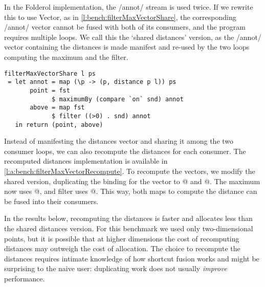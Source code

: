 In the Folderol implementation, the \Hs/annot/ stream is used twice.
If we rewrite this to use Vector, as in \cref{l:bench:filterMaxVectorShare}, the corresponding \Hs/annot/ vector cannot be fused with both of its consumers, and the program requires multiple loops.
We call this the `shared distances' version, as the \Hs/annot/ vector containing the distances is made manifest and re-used by the two loops computing the maximum and the filter.


\begin{lstlisting}[float,label=l:bench:filterMaxVectorShare,caption=Vector / share implementation of filterMax]
filterMaxVectorShare l ps
 = let annot = map (\p -> (p, distance p l)) ps
       point = fst
             $ maximumBy (compare `on` snd) annot
       above = map fst
             $ filter ((>0) . snd) annot
   in return (point, above)
\end{lstlisting}


Instead of manifesting the distances vector and sharing it among the two consumer loops, we can also recompute the distances for each consumer.
The recomputed distances implementation is available in \cref{l:a:bench:filterMaxVectorRecompute}.
To recompute the vectors, we modify the shared version, duplicating the binding for the \Hs@annot@ vector to @ and @. The maximum now uses @, and filter uses @.
This way, both maps to compute the distance can be fused into their consumers.

In the results below, recomputing the distances is faster and allocates less than the shared distances version.
For this benchmark we used only two-dimensional points, but it is possible that at higher dimensions the cost of recomputing distances may outweigh the cost of allocation.
The choice to recompute the distances requires intimate knowledge of how shortcut fusion works and might be surprising to the naive user: duplicating work does not usually \emph{improve} performance.


